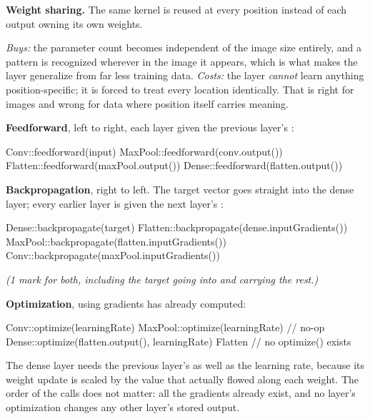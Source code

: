 \textbf{Weight sharing.} The same kernel is reused at every position instead of each output owning
its own weights.

\emph{Buys:} the parameter count becomes independent of the image size entirely, and a pattern is
recognized wherever in the image it appears, which is what makes the layer generalize from far less
training data.
\emph{Costs:} the layer \emph{cannot} learn anything position-specific; it is forced to treat every
location identically. That is right for images and wrong for data where position itself carries
meaning. 

\textbf{Feedforward}, left to right, each layer given the previous layer's :

\begin{console}
Conv::feedforward(input)
MaxPool::feedforward(conv.output())
Flatten::feedforward(maxPool.output())
Dense::feedforward(flatten.output())
\end{console}

\noindent\textbf{Backpropagation}, right to left. The target vector goes straight into the dense
layer; every earlier layer is given the next layer's :

\begin{console}
Dense::backpropagate(target)
Flatten::backpropagate(dense.inputGradients())
MaxPool::backpropagate(flatten.inputGradients())
Conv::backpropagate(maxPool.inputGradients())
\end{console}
\textit{(1 mark for both, including the target going into  and
 carrying the rest.)}

\textbf{Optimization}, using gradients  has already computed:

\begin{console}
Conv::optimize(learningRate)
MaxPool::optimize(learningRate)      // no-op
Dense::optimize(flatten.output(), learningRate)
Flatten                              // no optimize() exists
\end{console}

\noindent The dense layer needs the previous layer's  as well as the learning rate,
because its weight update is scaled by the value that actually flowed along each weight. The order
of the  calls does not matter: all the gradients already exist, and no layer's
optimization changes any other layer's stored output. 



